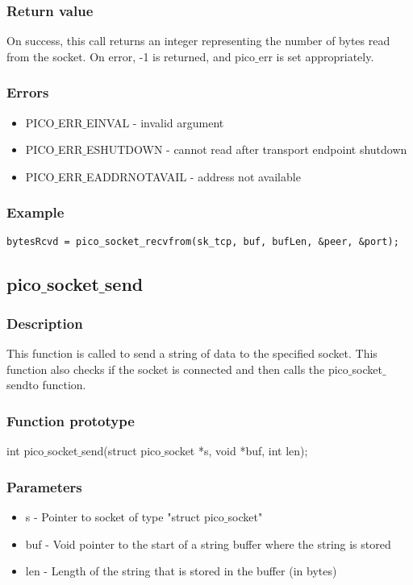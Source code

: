 \subsubsection*{Return value}
On success, this call returns an integer representing the number of bytes read from the socket.
On error, -1 is returned, and pico$\_$err is set appropriately.

\subsubsection*{Errors}
\begin{itemize}
\item PICO$\_$ERR$\_$EINVAL - invalid argument
\item PICO$\_$ERR$\_$ESHUTDOWN - cannot read after transport endpoint shutdown
\item PICO$\_$ERR$\_$EADDRNOTAVAIL - address not available
\end{itemize}

\subsubsection*{Example}
\begin{verbatim}
bytesRcvd = pico_socket_recvfrom(sk_tcp, buf, bufLen, &peer, &port);
\end{verbatim}


\subsection{pico$\_$socket$\_$send}

\subsubsection*{Description}
This function is called to send a string of data to the specified socket.
This function also checks if the socket is connected and then calls the
pico$\_$socket$\_$sendto function.

\subsubsection*{Function prototype}
int pico$\_$socket$\_$send(struct pico$\_$socket *s, void *buf, int len);

\subsubsection*{Parameters}
\begin{itemize}
\item s - Pointer to socket of type "struct pico$\_$socket"
\item buf - Void pointer to the start of a string buffer where the string is stored
\item len - Length of the string that is stored in the buffer (in bytes)
\end{itemize}

